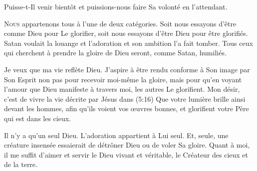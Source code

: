 Puisse-t-Il venir bientôt
 \ocadr et puissions-nous faire Sa volonté en l'attendant. 

\dvrule






\lettrine{N}{ous} appartenons tous à l'une de deux catégories.
 Soit nous essayons d'être comme Dieu pour Le glorifier,
 soit nous essayons d'être Dieu pour être glorifiés.
 Satan voulait la louange et l'adoration
 \ocadr et son ambition l'a fait tomber.
 Tous ceux qui cherchent à prendre la gloire de Dieu seront,
 comme Satan, humiliés. 


Je veux que ma vie reflète Dieu. J'aspire à être rendu conforme
 à Son image par Son Esprit \ocadr non pas pour recevoir moi-même la gloire,
 mais pour qu'en voyant l'amour que Dieu manifeste à travers moi,
 les autres Le glorifient.
 Mon désir, c'est de vivre la vie décrite par Jésus
 dans (5:16)\frcolon{}
 \Og Que votre lumière brille ainsi devant les hommes,
 afin qu'ils voient vos \oe{}uvres bonnes,
 et glorifient votre Père qui est dans les cieux. \Fg{}

Il n'y a qu'un seul Dieu. L'adoration appartient à Lui seul.
 Et, seule, 
 une créature insensée essaierait de détrôner Dieu ou de voler Sa gloire.
 Quant à moi, il me suffit d'aimer et servir le Dieu vivant et véritable,
 le Créateur des cieux et de la terre. 

\dvrule



